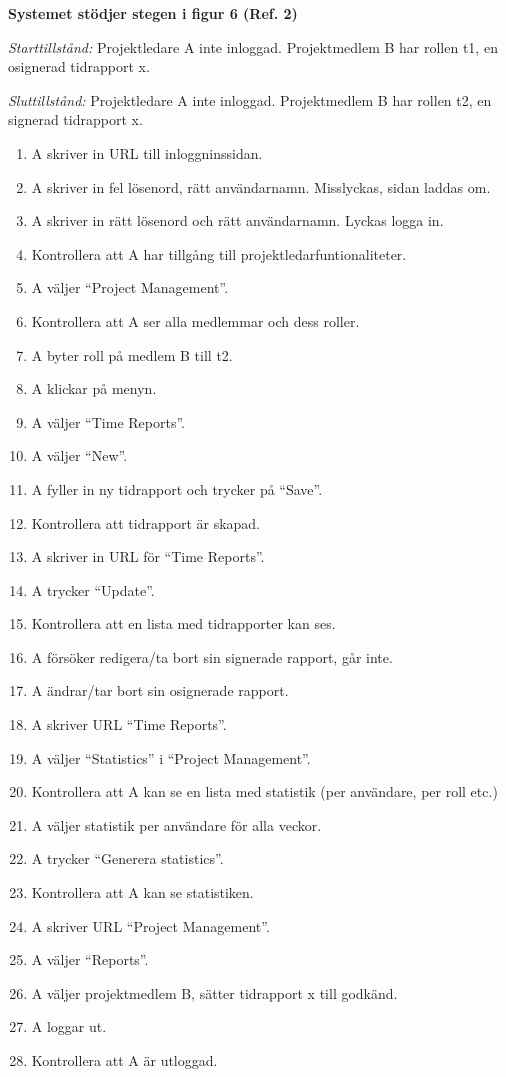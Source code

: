 \documentclass[a4paper]{article}
\begin{document}
\begin{ST}
\item 
\textbf{Systemet stödjer stegen i figur 6 (Ref. 2)}

\emph{Starttillstånd:} Projektledare A inte inloggad. Projektmedlem B har rollen t1, en osignerad tidrapport x.

\emph{Sluttillstånd:} Projektledare A inte inloggad. Projektmedlem B har rollen t2, en signerad tidrapport x.

\begin{enumerate}

\item A skriver in URL till inloggninssidan.
\item A skriver in fel lösenord, rätt användarnamn. Misslyckas, sidan laddas om.
\item A skriver in rätt lösenord och rätt användarnamn. Lyckas logga in.
\item Kontrollera att A har tillgång till projektledarfuntionaliteter.
\item A väljer ``Project Management''.
\item Kontrollera att A ser alla medlemmar och dess roller.
\item A byter roll på medlem B till t2.
\item A klickar på menyn.
\item A väljer ``Time Reports''.
\item A väljer ``New''.
\item A fyller in ny tidrapport och trycker på ``Save''.
\item Kontrollera att tidrapport är skapad.
\item A skriver in URL för ``Time Reports''.
\item A trycker ``Update''.
\item Kontrollera att en lista med tidrapporter kan ses.
\item A försöker redigera/ta bort sin signerade rapport, går inte.
\item A ändrar/tar bort sin osignerade rapport.
\item A skriver URL ``Time Reports''.
\item A väljer ``Statistics'' i ``Project Management''.
\item Kontrollera att A kan se en lista med statistik (per användare, per roll etc.)
\item A väljer statistik per användare för alla veckor.
\item A trycker ``Generera statistics''.
\item Kontrollera att A kan se statistiken.
\item A skriver URL ``Project Management''.
\item A väljer ``Reports''.
\item A väljer projektmedlem B, sätter tidrapport x till godkänd.
\item A loggar ut.
\item Kontrollera att A är utloggad.



\end{enumerate}

\end{ST}
\end{document}
